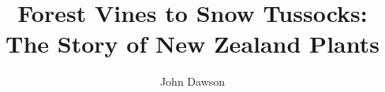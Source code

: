 
\title{Forest Vines to Snow Tussocks: The Story of New Zealand Plants}
\author{John Dawson}

%
\usepackage{geometry}
\usepackage[T1]{fontenc}
\usepackage{ebgaramond}
\usepackage{biolinum}
\usepackage{anyfontsize}

%
\setlength{\parskip}{0.6em}
\usepackage{enumitem}
\usepackage{xspace}
\usepackage{microtype}
\usepackage[mode=text]{siunitx}
%
\usepackage{longtable}
\usepackage{booktabs}
\usepackage{makecell}
\renewcommand\theadfont{\normalfont}
%
\usepackage{sectsty}
\allsectionsfont{\mdseries\sffamily\itshape\raggedright}%
%
\usepackage{marginnote}
\newcommand{\figureref}[1]{\marginnote{\small \itshape #1}}%
\usepackage[bottom,multiple]{footmisc}
\usepackage{xurl}

